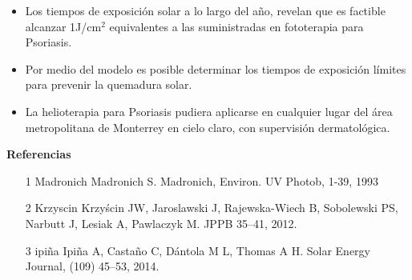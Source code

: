 \documentclass{article}
\begin{document}
\begin{multicols}{2}
\begin{minipage}{0.78\linewidth}
\begin{itemize}
    \item Los tiempos de exposición solar a lo largo del año, revelan que es factible alcanzar 1J/cm$^2$ equivalentes a las suministradas en fototerapia para Psoriasis.
    \item Por medio del modelo es posible determinar los tiempos de exposición límites para prevenir la quemadura solar.
    \item La helioterapia para Psoriasis pudiera aplicarse en cualquier lugar del área metropolitana de Monterrey en cielo claro, con supervisión dermatológica.
\end{itemize}
\end{minipage}
\end{multicols}
\vspace{-0.8cm}
\begin{center}
\begin{shaded}
\textbf{\textcolor{na}{Referencias}}
\end{shaded}
\end{center}
\changefontsizes{6pt}
\begin{enumerate}
    \item[1]{Madronich} Madronich S. Madronich, Environ. UV Photob, 1-39, 1993
    \item[2]{Krzyscin} Krzyścin JW, Jaroslawski J, Rajewska-Wiech B, Sobolewski PS, Narbutt J, Lesiak A, Pawlaczyk M. JPPB 35–41, 2012.
    \item[3]{ipiña} Ipiña A, Castaño C, Dántola M L, Thomas A H. Solar Energy Journal, (109) 45–53, 2014.
\end{enumerate}
\end{document}
